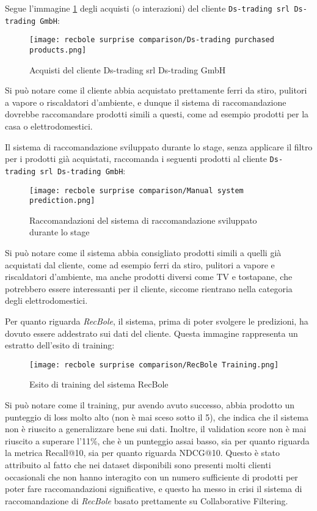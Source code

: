 Segue l'immagine \ref{fig:recbole-surprise-orders-export} degli acquisti (o interazioni) del cliente \texttt{Ds-trading srl Ds-trading GmbH}:

\begin{figure}[h]
    \centering
    \texttt{[image: recbole surprise comparison/Ds-trading purchased products.png]}
    \caption{Acquisti del cliente Ds-trading srl Ds-trading GmbH}
    \label{fig:recbole-surprise-orders-export}
\end{figure}

Si può notare come il cliente abbia acquistato prettamente ferri da stiro, pulitori a vapore o riscaldatori d'ambiente, e dunque il sistema di raccomandazione dovrebbe raccomandare prodotti simili a questi, come ad esempio prodotti per la casa o elettrodomestici.

Il sistema di raccomandazione sviluppato durante lo stage, senza applicare il filtro per i prodotti già acquistati, raccomanda i seguenti prodotti al cliente \texttt{Ds-trading srl Ds-trading GmbH}:

\begin{figure}[h]
    \centering
    \texttt{[image: recbole surprise comparison/Manual system prediction.png]}
    \caption{Raccomandazioni del sistema di raccomandazione sviluppato durante lo stage}
    \label{fig:our-system-recommendations}
\end{figure}

Si può notare come il sistema abbia consigliato prodotti simili a quelli già acquistati dal cliente, come ad esempio ferri da stiro, pulitori a vapore e riscaldatori d'ambiente, ma anche prodotti diversi come TV e tostapane, che potrebbero essere interessanti per il cliente, siccome rientrano nella categoria degli elettrodomestici.

Per quanto riguarda \emph{RecBole}, il sistema, prima di poter svolgere le predizioni, ha dovuto essere addestrato sui dati del cliente. Questa immagine rappresenta un estratto dell'esito di training:

\begin{figure}[h]
    \centering
    \texttt{[image: recbole surprise comparison/RecBole Training.png]}
    \caption{Esito di training del sistema RecBole}
    \label{fig:recbole-training-outcome}
\end{figure}

Si può notare come il training, pur avendo avuto successo, abbia prodotto un punteggio di loss molto alto (non è mai sceso sotto il 5), che indica che il sistema non è riuscito a generalizzare bene sui dati. Inoltre, il validation score non è mai riuscito a superare l'11\%, che è un punteggio assai basso, sia per quanto riguarda la metrica Recall@10, sia per quanto riguarda NDCG@10. Questo è stato attribuito al fatto che nei dataset disponibili sono presenti molti clienti occasionali che non hanno interagito con un numero sufficiente di prodotti per poter fare raccomandazioni significative, e questo ha messo in crisi il sistema di raccomandazione di \emph{RecBole} basato prettamente su Collaborative Filtering.

